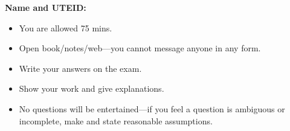 \documentclass[11pt]{exam}
\title{}
\author{}
\date{}
\begin{document}
\maketitle

\large

{\bf Name and UTEID:}
\vfill

\begin{itemize}
\item You are allowed 75 mins.
\item Open book/notes/web---you cannot message anyone in any form.
\item Write your answers on the exam. 
\item Show your work and give explanations. 
\item No questions will be entertained---if you feel
a question is ambiguous or incomplete, make and state
reasonable assumptions. 
\end{itemize}

\vfill
\begin{center}
\pointtable[h][questions]
\end{center}

\vfill

\newpage
\end{document}
